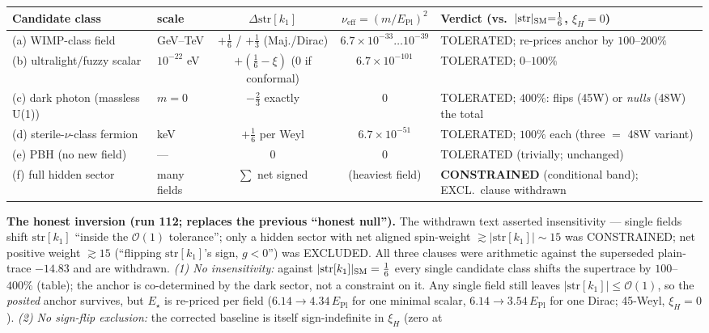 \documentclass[11pt]{article}
\newcommand{\Epl}{E_{\mathrm{Pl}}}
\newcommand{\str}{\mathrm{str}}
\begin{document}
\begin{center}\small
\footnotesize\setlength{\tabcolsep}{4pt}%
\begin{tabular}{@{}l l c c >{\raggedright\arraybackslash}p{2.9cm}@{}}
\toprule
Candidate class & scale & $\Delta\str[k_1]$ & $\nu_{\mathrm{eff}}=(m/\Epl)^2$ & Verdict (vs.\ $|\str|_{\rm SM}{=}\tfrac16$, $\xi_H{=}0$) \\
\midrule
(a) WIMP-class field      & GeV--TeV   & $+\tfrac16$ / $+\tfrac13$ (Maj./Dirac) & $6.7{\times}10^{-33}\!\dots\!10^{-39}$ & TOLERATED; re-prices anchor by $100$--$200\%$ \\
(b) ultralight/fuzzy scalar & $10^{-22}$ eV & $+(\tfrac16-\xi)$ (0 if conformal) & $6.7{\times}10^{-101}$ & TOLERATED; $0$--$100\%$ \\
(c) dark photon (massless U(1)) & $m=0$ & $-\tfrac23$ exactly & $0$ & TOLERATED; $400\%$: flips (45W) or \emph{nulls} (48W) the total \\
(d) sterile-$\nu$-class fermion & keV & $+\tfrac16$ per Weyl & $6.7{\times}10^{-51}$ & TOLERATED; $100\%$ each (three ${=}$ 48W variant) \\
(e) PBH (no new field)    & --- & $0$ & $0$ & TOLERATED (trivially; unchanged) \\
(f) full hidden sector    & many fields & $\sum$ net signed & (heaviest field) & \textbf{CONSTRAINED} (conditional band); EXCL.\ clause withdrawn \\
\bottomrule
\end{tabular}
\end{center}
\noindent\textbf{The honest inversion (run 112; replaces the previous ``honest null'').}
The withdrawn text asserted insensitivity --- single fields shift $\str[k_1]$ ``inside the
$\mathcal O(1)$ tolerance''; only a hidden sector with net aligned spin-weight
$\gtrsim|\str[k_1]|\sim15$ was CONSTRAINED; net positive weight $\gtrsim15$ (``flipping
$\str[k_1]$'s sign, $g<0$'') was EXCLUDED. All three clauses were arithmetic against the
superseded plain-trace $-14.83$ and are withdrawn. \emph{(1) No insensitivity:} against
$|\str[k_1]|_{\rm SM}=\tfrac16$ every single candidate class shifts the supertrace by
$100$--$400\%$ (table); the anchor is co-determined by the dark sector, not a constraint on
it. Any single field still leaves $|\str[k_1]|\le\mathcal O(1)$, so the \emph{posited}
anchor survives, but $E_\star$ is re-priced per field ($6.14\to4.34\,\Epl$ for one minimal
scalar, $6.14\to3.54\,\Epl$ for one Dirac; 45-Weyl, $\xi_H=0$). \emph{(2) No sign-flip
exclusion:} the corrected baseline is itself sign-indefinite in $\xi_H$ (zero at
\end{document}
